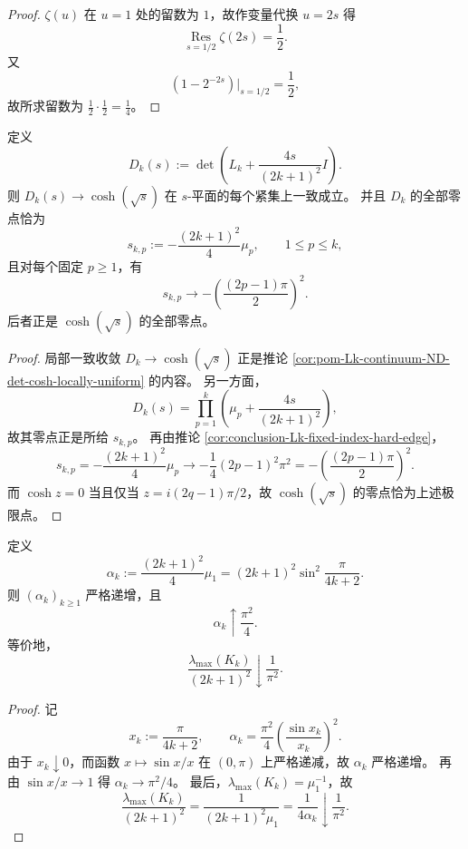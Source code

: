 \begin{proof}
\(\zeta(u)\) 在 \(u=1\) 处的留数为 \(1\)，故作变量代换 \(u=2s\) 得
\[
\operatorname*{Res}_{s=1/2}\zeta(2s)=\frac12.
\]
又
\[
\left(1-2^{-2s}\right)\Big|_{s=1/2}=\frac12,
\]
故所求留数为 \(\frac12\cdot\frac12=\frac14\)。
\end{proof}

\begin{theorem}[ND 行列式极限的零点逐一追踪]\label{thm:conclusion-Lk-nd-determinant-zero-tracking}
定义
\[
D_k(s):=\det\!\left(L_k+\frac{4s}{(2k+1)^2}I\right).
\]
则 \(D_k(s)\to \cosh(\sqrt{s})\) 在 \(s\)-平面的每个紧集上一致成立。
并且 \(D_k\) 的全部零点恰为
\[
s_{k,p}:=-\frac{(2k+1)^2}{4}\mu_p,
\qquad 1\le p\le k,
\]
且对每个固定 \(p\ge 1\)，有
\[
s_{k,p}\longrightarrow -\left(\frac{(2p-1)\pi}{2}\right)^2.
\]
后者正是 \(\cosh(\sqrt{s})\) 的全部零点。
\end{theorem}

\begin{proof}
局部一致收敛 \(D_k\to \cosh(\sqrt{s})\) 正是推论 \ref{cor:pom-Lk-continuum-ND-det-cosh-locally-uniform} 的内容。
另一方面，
\[
D_k(s)=\prod_{p=1}^k\left(\mu_p+\frac{4s}{(2k+1)^2}\right),
\]
故其零点正是所给 \(s_{k,p}\)。
再由推论 \ref{cor:conclusion-Lk-fixed-index-hard-edge}，
\[
s_{k,p}
=
-\frac{(2k+1)^2}{4}\mu_p
\longrightarrow
-\frac14(2p-1)^2\pi^2
=
-\left(\frac{(2p-1)\pi}{2}\right)^2.
\]
而 \(\cosh z=0\) 当且仅当 \(z=i(2q-1)\pi/2\)，故 \(\cosh(\sqrt{s})\) 的零点恰为上述极限点。
\end{proof}

\begin{corollary}[第一零点的单调逼近律]\label{cor:conclusion-Lk-first-zero-monotone-approach}
定义
\[
\alpha_k:=\frac{(2k+1)^2}{4}\mu_1
=(2k+1)^2\sin^2\!\frac{\pi}{4k+2}.
\]
则 \((\alpha_k)_{k\ge 1}\) 严格递增，且
\[
\alpha_k\uparrow \frac{\pi^2}{4}.
\]
等价地，
\[
\frac{\lambda_{\max}(K_k)}{(2k+1)^2}\downarrow \frac{1}{\pi^2}.
\]
\end{corollary}

\begin{proof}
记
\[
x_k:=\frac{\pi}{4k+2},
\qquad
\alpha_k=\frac{\pi^2}{4}\left(\frac{\sin x_k}{x_k}\right)^2.
\]
由于 \(x_k\downarrow 0\)，而函数 \(x\mapsto \sin x/x\) 在 \((0,\pi)\) 上严格递减，故 \(\alpha_k\) 严格递增。
再由 \(\sin x/x\to 1\) 得 \(\alpha_k\to \pi^2/4\)。
最后，\(\lambda_{\max}(K_k)=\mu_1^{-1}\)，故
\[
\frac{\lambda_{\max}(K_k)}{(2k+1)^2}
=
\frac{1}{(2k+1)^2\mu_1}
=
\frac{1}{4\alpha_k}
\downarrow \frac{1}{\pi^2}.
\]
\end{proof}

